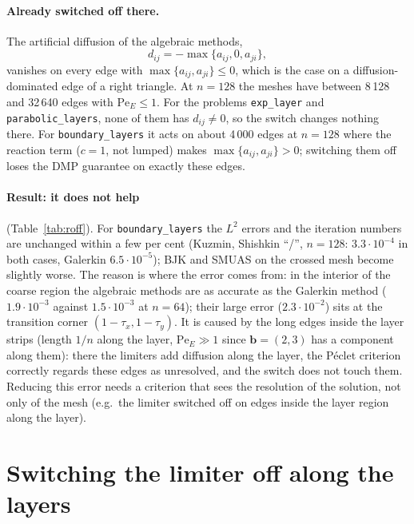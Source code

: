 \documentclass[11pt]{article}
\newcommand{\bb}{\boldsymbol{b}}
\begin{document}
\paragraph{Already switched off there.} The artificial diffusion of the algebraic methods,
\[
  d_{ij}=-\max\{a_{ij},0,a_{ji}\},
\]
vanishes on every edge with $\max\{a_{ij},a_{ji}\}\le0$, which is the case on a diffusion-dominated edge of a right
triangle. At $n=128$ the meshes have between 8\,128 and 32\,640 edges
with $\mathrm{Pe}_E\le1$. For the problems \texttt{exp\_layer} and \texttt{parabolic\_layers}, none of them has
$d_{ij}\ne0$, so the switch changes nothing there. For
\texttt{boundary\_layers} it acts on about 4\,000 edges at $n=128$ where the reaction term ($c=1$, not lumped) makes
$\max\{a_{ij},a_{ji}\}>0$; switching them off loses the DMP guarantee on exactly these edges.



\paragraph{Result: it does not help} (Table~\ref{tab:roff}). For \texttt{boundary\_layers} the $L^2$ errors and the
iteration numbers are unchanged within a few per cent (Kuzmin, Shishkin ``/'', $n=128$: $3.3\cdot10^{-4}$ in both
cases, Galerkin $6.5\cdot10^{-5}$); BJK and SMUAS on the crossed mesh become slightly worse. The reason is where the
error comes from: in the interior of the coarse region the algebraic methods are as accurate as the Galerkin method
($1.9\cdot10^{-3}$ against $1.5\cdot10^{-3}$ at $n=64$); their large error ($2.3\cdot10^{-2}$) sits at the transition
corner $(1-\tau_x,1-\tau_y)$. It is caused by the long edges inside the layer strips (length $1/n$ along the layer,
$\mathrm{Pe}_E\gg1$ since $\bb=(2,3)$ has a component along them): there the limiters add diffusion along the layer,
the P\'eclet criterion correctly regards these edges as unresolved, and the switch does not touch them. Reducing this
error needs a criterion that sees the resolution of the solution, not only of the mesh (e.g.\ the limiter switched
off on edges inside the layer region along the layer).

\section{Switching the limiter off along the layers}\label{sec:loff}
\end{document}
